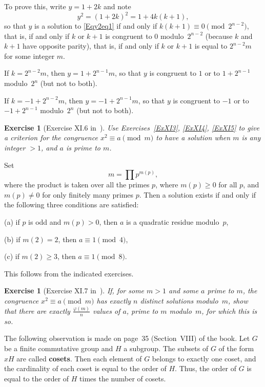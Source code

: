\documentclass[12pt,letterpaper]{article}
\newtheorem{exer}[thm]{Exercise}
\theoremstyle{definition}
\begin{document}
To prove this, write $y=1+2k$ and note 
$$
y^2=(1+2k)^2=1+4k(k+1),
$$ 
so that $y$ is a solution to \eqref{Eqy2eq1} if and only if $k(k+1)\equiv0\pmod{2^{n-2}}$, that is, if and only if $k$ or $k+1$ is congruent to $0$ modulo~$2^{n-2}$ (because $k$ and $k+1$ have opposite parity), that is, if and only if $k$ or $k+1$ is equal to $2^{n-2}m$ for some integer $m$. 

If $k=2^{n-2}m$, then $y=1+2^{n-1}m$, so that $y$ is congruent to $1$ or to $1+2^{n-1}$ modulo~$2^n$ (but not to both). 

If $k=-1+2^{n-2}m$, then $y=-1+2^{n-1}m$, so that $y$ is congruent to $-1$ or to $-1+2^{n-1}$ modulo~$2^n$ (but not to both). 

\begin{exer}[Exercise XI.6 in~\cite{weil1979}]
Use Exercises~\ref{ExXI3}, \ref{ExXI4}, \ref{ExXI5} to give a criterion for the congruence $x^2\equiv a\pmod m$ to have a solution when $m$ is any integer $>1$, and $a$ is prime to $m$.
\end{exer}

Set 
$$
m=\prod p^{m(p)},
$$ 
where the product is taken over all the primes $p$, where $m(p)\ge0$ for all $p$, and $m(p)\ne0$ for only finitely many primes $p$. Then a solution exists if and only if the following three conditions are satisfied: 

(a) if $p$ is odd and $m(p)>0$, then $a$ is a quadratic residue modulo~$p$, 

(b) if $m(2)=2$, then $a\equiv1\pmod4$, 

(c) if $m(2)\ge3$, then $a\equiv1\pmod8$. 

\noindent This follows from the indicated exercises. 

\begin{exer}[Exercise XI.7 in~\cite{weil1979}]
If, for some $m>1$ and some $a$ prime to $m$, the congruence $x^2\equiv a\pmod m$ has exactly $n$ distinct solutions modulo~$m$, show that there are exactly $\frac{\varphi(m)}{n}$ values of $a$, prime to $m$ modulo~$m$, for which this is so.
\end{exer} 

The following observation is made on page~35 (Section~VIII) of the book. Let $G$ be a finite commutative group and $H$ a subgroup. The subsets of $G$ of the form $xH$ are called \textbf{cosets}.  Then each element of $G$ belongs to exactly one coset, and the cardinality of each coset is equal to the order of $H$. Thus, the order of $G$ is equal to the order of $H$ times the number of cosets. 
\end{document}
